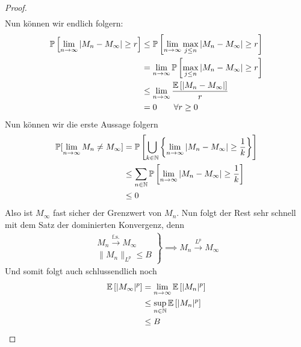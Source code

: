 \documentclass[12pt,a4paper]{article}
\begin{document}
\begin{proof}
\begin{align*}
	\end{align*}
	Nun können wir endlich folgern:
	\begin{align*}
		\mathbb{P}\left[\lim\limits_{n\rightarrow\infty}|M_n-M_\infty| \geq r\right] 
		&\leq
		\mathbb{P}\left[\lim\limits_{n\rightarrow\infty}\max\limits_{j\leq n}|M_n-M_\infty| \geq r\right]  \\
		&=\lim\limits_{n\rightarrow\infty}\mathbb{P}\left[\max\limits_{j\leq n}|M_n-M_\infty| \geq r\right]  \\
		&\leq\lim\limits_{n\rightarrow\infty}\frac{\mathbb{E}\left[|M_n-M_\infty|\right]}{r}  \\
		&= 0 \qquad \forall r\geq 0
	\end{align*}
	Nun können wir die erste Aussage folgern
	\begin{align*}
		\mathbb{P}[\lim\limits_{n\rightarrow\infty}M_n \neq M_\infty]
		&=\mathbb{P}\left[\bigcup\limits_{k\in\mathbb{N}}\left\lbrace\lim\limits_{n\rightarrow\infty}|M_n-M_\infty| \geq \frac{1}{k}\right\rbrace\right] \\
		&\leq \sum\limits_{n\in\mathbb{N}}
		\mathbb{P}\left[\lim\limits_{n\rightarrow\infty}|M_n-M_\infty| \geq \frac{1}{k}\right] \\
		&\leq 0
	\end{align*}
	Also ist $M_\infty$ fast sicher der Grenzwert von $M_n$. Nun folgt der Rest sehr schnell mit dem Satz der dominierten Konvergenz, denn
	\begin{align*}
		\left.\begin{array}{c}
				M_n \stackrel{\text{f.s.}}{\rightarrow}M_\infty \\
				\|M_n\|_{L^p} \leq B 
			\end{array}\right\rbrace\implies M_n \stackrel{L^p}{\rightarrow}M_\infty
	\end{align*}
	Und somit folgt auch schlussendlich noch
	\begin{align*}
		\mathbb{E}\left[|M_\infty|^p\right] &= 
		\lim\limits_{n\rightarrow\infty}\mathbb{E}\left[|M_n|^p\right]  \\
		&\leq \sup\limits_{n\in\mathbb{N}}\mathbb{E}\left[|M_n|^p\right] \\
		&\leq B
	\end{align*}

\end{proof}
\end{document}
